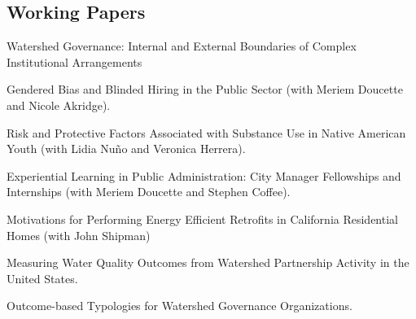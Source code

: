 \documentclass[11pt,letterpaper]{article}
\renewenvironment{itemize}{
  \begin{list}{}{
    \setlength{\leftmargin}{1.5em}
    \setlength{\itemsep}{0.25em}
    \setlength{\parskip}{0pt}
    \setlength{\parsep}{0.25em}
  }
}{
  \end{list}
}
\begin{document}
\subsection*{Working Papers}

\begin{itemize}\leftmargin=2pt\itemindent=-15pt

\item Watershed Governance: Internal and External Boundaries of Complex Institutional Arrangements
\item Gendered Bias and Blinded Hiring in the Public Sector (with Meriem Doucette and Nicole Akridge).
\item Risk and Protective Factors Associated with Substance Use in Native American Youth (with Lidia Nu\~no and Veronica Herrera). 
\item Experiential Learning in Public Administration: City Manager Fellowships and Internships (with Meriem Doucette and Stephen Coffee).
\item Motivations for Performing Energy Efficient Retrofits in California Residential Homes (with John Shipman)
\item Measuring Water Quality Outcomes from Watershed Partnership Activity in the United States.
\item Outcome-based Typologies for Watershed Governance Organizations.
\end{itemize}
\end{document}
